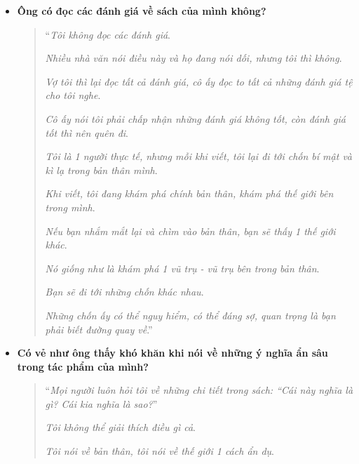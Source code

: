 \documentclass{book}
\numberwithin{equation}{section}
\begin{document}
\begin{itemize}
\begin{quotation}
        \textit{Cùng với đó, tôi chạy bộ, nghe nhạc và làm việc nhà như ủi quần áo}.
        
        \textit{Tôi yêu việc ủi đồ}.
        
        \textit{Khi ủi đồ, tâm trí tôi thư thái và thoải mái}.''
    \end{quotation}
    
    \item \textbf{Ông có đọc các đánh giá về sách của mình không?}
    
    \begin{quotation}
        ``\textit{Tôi không đọc các đánh giá}.
        
        \textit{Nhiều nhà văn nói điều này và họ đang nói dối, nhưng tôi thì không}.
        
        \textit{Vợ tôi thì lại đọc tất cả đánh giá, cô ấy đọc to tất cả những đánh giá tệ cho tôi nghe}.
        
        \textit{Cô ấy nói tôi phải chấp nhận những đánh giá không tốt, còn đánh giá tốt thì nên quên đi}.
        
        \textit{Tôi là 1 người thực tế, nhưng mỗi khi viết, tôi lại đi tới chốn bí mật và kì lạ trong bản thân mình}.
        
        \textit{Khi viết, tôi đang khám phá chính bản thân, khám phá thế giới bên trong mình}.
        
        \textit{Nếu bạn nhắm mắt lại và chìm vào bản thân, bạn sẽ thấy 1 thế giới khác}.
        
        \textit{Nó giống như là khám phá 1 vũ trụ - vũ trụ bên trong bản thân}.
        
        \textit{Bạn sẽ đi tới những chốn khác nhau}.
        
        \textit{Những chốn ấy có thể nguy hiểm, có thể đáng sợ, quan trọng là bạn phải biết đường quay về}.''
    \end{quotation}    
    
    \item \textbf{Có vẻ như ông thấy khó khăn khi nói về những ý nghĩa ẩn sâu trong tác phẩm của mình?}
    
    \begin{quotation}
        ``\textit{Mọi người luôn hỏi tôi về những chi tiết trong sách: ``\emph{Cái này nghĩa là gì? Cái kia nghĩa là sao?}}''
        
        \textit{Tôi không thể giải thích điều gì cả}.
        
        \textit{Tôi nói về bản thân, tôi nói về thế giới 1 cách ẩn dụ}.
        

\end{quotation}
\end{itemize}
\end{document}
